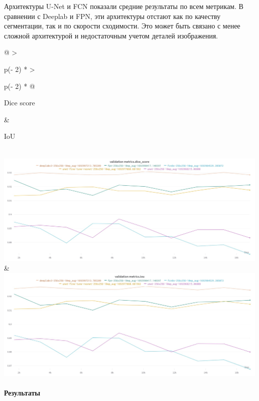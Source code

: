 \documentclass[11pt]{article}
\begin{document}
Архитектуры U-Net и FCN показали средние результаты по всем метрикам. В
сравнении с Deeplab и FPN, эти архитектуры отстают как по качеству
сегментации, так и по скорости сходимости. Это может быть связано с
менее сложной архитектурой и недостаточным учетом деталей изображения.

\begin{longtable}[]{@{}
  >{\raggedright\arraybackslash}p{(\columnwidth - 2\tabcolsep) * }
  >{\raggedright\arraybackslash}p{(\columnwidth - 2\tabcolsep) * }@{}}
\toprule\noalign{}
\begin{minipage}[b]{\linewidth}\raggedright
Dice score
\end{minipage} & \begin{minipage}[b]{\linewidth}\raggedright
IoU
\end{minipage} \\
\midrule\noalign{}
\endhead
\bottomrule\noalign{}
\endlastfoot
\includegraphics{../resources/dice-score-val.jpg} &
\includegraphics{../resources/iou-val.jpg} \\
\end{longtable}

    \hypertarget{ux440ux435ux437ux443ux43bux44cux442ux430ux442ux44b}{%
\paragraph{Результаты}\label{ux440ux435ux437ux443ux43bux44cux442ux430ux442ux44b}}
\end{document}
